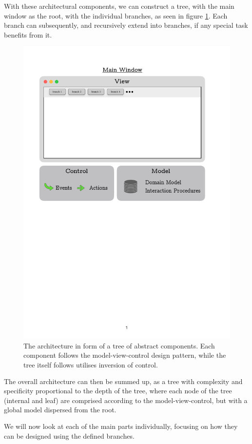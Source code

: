 With these architectural components, we can construct a tree, with the main window as the root, with the individual branches, as seen in figure \ref{fig:Architecture-Tree}. Each branch can subsequently, and recursively extend into branches, if any special task benefits from it. 

\begin{figure}[H]
    \centering
    \includegraphics[page=3, width=0.9\linewidth]{.Figures/Architecture.pdf}
    \caption{The architecture in form of a tree of abstract components. Each component follows the model-view-control design pattern, while the tree itself follows utilises inversion of control.}
    \label{fig:Architecture-Tree}
\end{figure}

The overall architecture can then be summed up, as a tree with complexity and specificity proportional to the depth of the tree, where each node of the tree (internal and leaf) are comprised according to the model-view-control, but with a global model dispersed from the root.

\vspace{1cm}
We will now look at each of the main parts individually, focusing on how they can be designed using the defined branches.